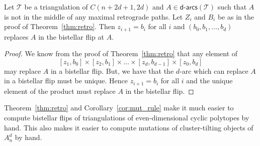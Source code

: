 \documentclass[ALCO,Unicode,published]{cedram}
\newcommand{\darcs}[1]{\mathsf{d}\text{-}\mathsf{arcs}(#1)} %
\begin{document}
\begin{coro}\label{cor:mut_rule}
Let $\mathcal{T}$ be a triangulation of $C(n + 2d + 1, 2d)$ and $A \in \darcs{\mathcal{T}}$ such that $A$ is not in the middle of any maximal retrograde paths. Let $Z_{i}$ and $B_{i}$ be as in the proof of Theorem~\ref{thm:retro}. Then $z_{i + 1} = b_{i}$ for all $i$ and $(b_{0}, b_{1}, \dots, b_{d})$ replaces $A$ in the bistellar flip at $A$.
\end{coro}
\begin{proof}
We know from the proof of Theorem~\ref{thm:retro} that any element of \[[z_{1}, b_{0}] \times [z_{2}, b_{1}] \times \dots \times [z_{d}, b_{d - 1}] \times [z_{0},b_{d}]\] may replace $A$ in a bistellar flip. But, we have that the $d$-arc which can replace $A$ in a bistellar flip must be unique. Hence $z_{i + 1} = b_{i}$ for all $i$ and the unique element of the product must replace $A$ in the bistellar flip.
\end{proof}

Theorem~\ref{thm:retro} and Corollary~\ref{cor:mut_rule} make it much easier to compute bistellar flips of triangulations of even-dimensional cyclic polytopes by hand. This also makes it easier to compute mutations of cluster-tilting objects of $A_{n}^{d}$ by hand.
\end{document}
